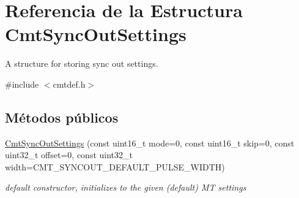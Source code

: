 \hypertarget{structCmtSyncOutSettings}{\section{\-Referencia de la \-Estructura \-Cmt\-Sync\-Out\-Settings}
\label{structCmtSyncOutSettings}
}


\-A structure for storing sync out settings.  




{\ttfamily \#include $<$cmtdef.\-h$>$}

\subsection*{\-Métodos públicos}
\begin{DoxyCompactItemize}
\item 
\hypertarget{structCmtSyncOutSettings_a98eaa723a523e535c41154b5f03cc1dd}{\hyperlink{structCmtSyncOutSettings_a98eaa723a523e535c41154b5f03cc1dd}{\-Cmt\-Sync\-Out\-Settings} (const uint16\-\_\-t mode=0, const uint16\-\_\-t skip=0, const uint32\-\_\-t offset=0, const uint32\-\_\-t width=\-C\-M\-T\-\_\-\-S\-Y\-N\-C\-O\-U\-T\-\_\-\-D\-E\-F\-A\-U\-L\-T\-\_\-\-P\-U\-L\-S\-E\-\_\-\-W\-I\-D\-T\-H)}\label{structCmtSyncOutSettings_a98eaa723a523e535c41154b5f03cc1dd}

\begin{DoxyCompactList}\small\item\em default constructor, initializes to the given (default) \-M\-T settings \end{DoxyCompactList}\end{DoxyCompactItemize}
